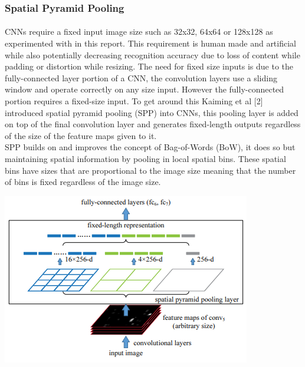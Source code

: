 \documentclass{article}
\begin{document}
\subsubsection{Spatial Pyramid Pooling}
\paragraph{}
CNNs require a fixed input image size such as 32x32, 64x64 or 128x128 as experimented with in this report. This requirement is human made and artificial while also potentially decreasing recognition accuracy due to loss of content while padding or distortion while resizing. The need for fixed size inputs is due to the fully-connected layer portion of a CNN, the convolution layers use a sliding window and operate correctly on any size input. However the fully-connected portion requires a fixed-size input. To get around this Kaiming et al [2] introduced spatial pyramid pooling (SPP) into CNNs, this pooling layer is added on top of the final convolution layer and generates fixed-length outputs regardless of the size of the feature maps given to it.  \\

SPP builds on and improves the concept of Bag-of-Words (BoW), it does so but maintaining spatial information by pooling in local spatial bins. These spatial bins have sizes that are proportional to the image size meaning that the number of bins is fixed regardless of the image size.

\begin{center}
	\includegraphics{spp}
\end{center}
\end{document}
